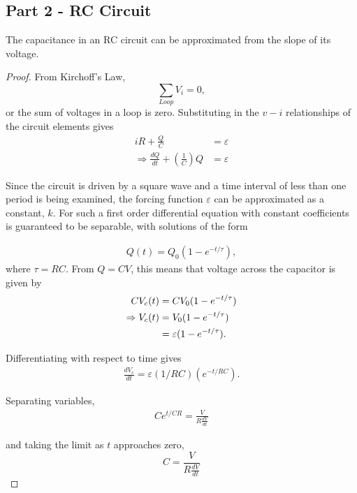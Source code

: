 \documentclass[twocolumn,english]{IEEEtran}
\theoremstyle{plain}
\theoremstyle{plain}
\begin{document}
\subsection{Part 2 - RC Circuit}
The capacitance in an RC circuit can be approximated from the slope of its voltage.
\begin{proof}
	From Kirchoff's Law,
	\begin{equation*}
		\sum_{Loop}V_i = 0,
	\end{equation*}
	or the sum of voltages in a loop is zero. Substituting in the $v-i$ relationships of the circuit elements gives
	\begin{align*}
		iR +\frac{Q}{C} &= \varepsilon \\
		\Rightarrow \frac{dQ}{dt} + \left(\frac{1}{C}\right)Q &= \varepsilon
	\end{align*}

	Since the circuit is driven by a square wave and a time interval of less than one period is being examined, the forcing function $\varepsilon$ can be approximated as a constant, $k$. For such a first order differential equation with constant coefficients is guaranteed to be separable, with solutions of the form

	\begin{align*}
		Q(t) = Q_0(1-e^{-t/\tau}),
	\end{align*}
	where $\tau = RC$. From $Q=CV$, this means that voltage across the capacitor is given by
	\begin{align}\label{eq:voltage}
		CV_c(t) &= C V_0 (1-e^{-t/\tau})	\notag \\
		\Rightarrow V_c(t) &= V_0 (1-e^{-t/\tau}) \notag \\
		&= \varepsilon(1-e^{-t/\tau}).
	\end{align}

	Differentiating with respect to time gives
	\begin{align*}
		\frac{dV_c}{dt} = \varepsilon(1/RC)(e^{-t/RC}).
	\end{align*}

	Separating variables,
	\begin{align*}
		Ce^{t/CR} = \frac{V}{R \frac{dV}{dt}}
	\end{align*}

	and taking the limit as $t$ approaches zero,
	\begin{equation}
		C = \frac{V}{R \frac{dV}{dt}}
	\end{equation}
\end{proof}
\end{document}
